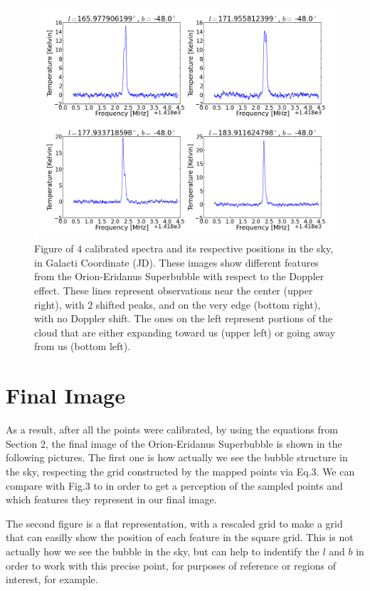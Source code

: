 \documentclass{article}
\begin{document}
\begin{figure}[H]
\center
\includegraphics[scale=0.46]{calib.png}
\caption {Figure of $4$ calibrated spectra and its respective positions in the sky, 
in Galacti Coordinate (JD). These images show different features from the Orion-Eridanus
Superbubble with respect to the Doppler effect. These lines represent observations 
near the center (upper right), with $2$ shifted peaks, and on the very edge (bottom right),
with no Doppler shift. The ones on the left represent portions of the cloud that are either
expanding toward us (upper left) or going away from us (bottom left).} 
\label{moon_win}
\end{figure}


\section{Final Image} 

As a result, after all the points were calibrated, by using the equations from Section 2,
the final image of the Orion-Eridanus Superbubble is shown in the following pictures. The first one
is how actually we see the bubble structure in the sky, respecting the grid constructed by
the mapped points via Eq.3. We can compare with Fig.3 to in order to get a perception
of the sampled points and which features they represent in our final image. 

The second figure is a flat representation, with a rescaled grid to make a grid that 
can easilly show the position of each feature in the square grid. This is not actually
how we see the bubble in the sky, but can help to indentify the $l$ and $b$ in order
to work with this precise point, for purposes of reference or regions of interest, for example.
\end{document}
